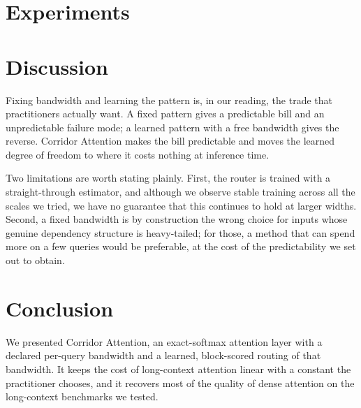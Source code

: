 \documentclass[11pt]{article}
\begin{document}
\section{Experiments}\label{sec:experiments}


\section{Discussion}\label{sec:discussion}

Fixing bandwidth and learning the pattern is, in our reading, the trade that
practitioners actually want. A fixed pattern gives a predictable bill and an
unpredictable failure mode; a learned pattern with a free bandwidth gives the
reverse. Corridor Attention makes the bill predictable and moves the learned
degree of freedom to where it costs nothing at inference time.

Two limitations are worth stating plainly. First, the router is trained with a
straight-through estimator, and although we observe stable training across all
the scales we tried, we have no guarantee that this continues to hold at
larger widths. Second, a fixed bandwidth is by construction the wrong choice
for inputs whose genuine dependency structure is heavy-tailed; for those, a
method that can spend more on a few queries would be preferable, at the cost of
the predictability we set out to obtain.

\section{Conclusion}\label{sec:conclusion}

We presented Corridor Attention, an exact-softmax attention layer with a
declared per-query bandwidth and a learned, block-scored routing of that
bandwidth. It keeps the cost of long-context attention linear with a constant
the practitioner chooses, and it recovers most of the quality of dense
attention on the long-context benchmarks we tested.



\end{document}
